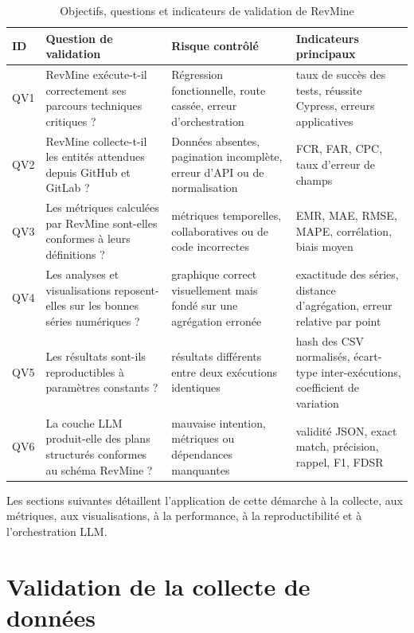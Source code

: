 \begin{table}[H]
\centering
\small
\caption{Objectifs, questions et indicateurs de validation de RevMine}
\label{tab:questions-validation-revmine}
\begin{tabularx}{\textwidth}{|p{1.4cm}|X|X|X|}
\hline
\textbf{ID} & \textbf{Question de validation} & \textbf{Risque contrôlé} & \textbf{Indicateurs principaux} \\
\hline
QV1 & RevMine exécute-t-il correctement ses parcours techniques critiques ? & Régression fonctionnelle, route cassée, erreur d'orchestration & taux de succès des tests, réussite Cypress, erreurs applicatives \\
\hline
QV2 & RevMine collecte-t-il les entités attendues depuis GitHub et GitLab ? & Données absentes, pagination incomplète, erreur d'API ou de normalisation & FCR, FAR, CPC, taux d'erreur de champs \\
\hline
QV3 & Les métriques calculées par RevMine sont-elles conformes à leurs définitions ? & métriques temporelles, collaboratives ou de code incorrectes & EMR, MAE, RMSE, MAPE, corrélation, biais moyen \\
\hline
QV4 & Les analyses et visualisations reposent-elles sur les bonnes séries numériques ? & graphique correct visuellement mais fondé sur une agrégation erronée & exactitude des séries, distance d'agrégation, erreur relative par point \\
\hline
QV5 & Les résultats sont-ils reproductibles à paramètres constants ? & résultats différents entre deux exécutions identiques & hash des CSV normalisés, écart-type inter-exécutions, coefficient de variation \\
\hline
QV6 & La couche LLM produit-elle des plans structurés conformes au schéma RevMine ? & mauvaise intention, métriques ou dépendances manquantes & validité JSON, exact match, précision, rappel, F1, FDSR \\
\hline
\end{tabularx}
\end{table}

Les sections suivantes détaillent l'application de cette démarche à la collecte, aux métriques,
aux visualisations, à la performance, à la reproductibilité et à l'orchestration LLM.

\section{Validation de la collecte de données}
\label{sec:validation-collecte}

